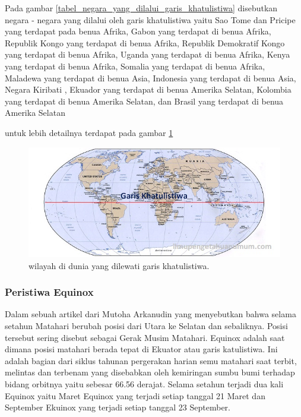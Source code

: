 	Pada gambar \ref{tabel_negara_yang_dilalui_garis_khatulistiwa} disebutkan negara - negara yang dilalui oleh garis khatulistiwa yaitu Sao Tome dan Pricipe 
yang terdapat pada benua Afrika, Gabon yang terdapat di benua Afrika, Republik Kongo yang terdapat di benua Afrika, Republik Demokratif Kongo yang terdapat 
di benua Afrika, Uganda yang terdapat di benua Afrika, Kenya yang terdapat di benua Afrika, Somalia yang terdapat di benua Afrika, Maladewa yang terdapat 
di benua Asia, Indonesia yang terdapat di benua Asia, Negara Kiribati , Ekuador yang terdapat di benua Amerika Selatan, Kolombia 
yang terdapat di benua Amerika Selatan, dan Brasil yang terdapat di benua Amerika Selatan
	
	untuk lebih detailnya terdapat pada gambar \ref{Peta_Dunia_Negara_Khatulistiwa}
	
\begin{figure}[ht]
\centerline{\includegraphics[width=1\textwidth]{figures/Peta_Dunia_Negara_Khatulistiwa.JPG}}
\caption{wilayah di dunia yang dilewati garis khatulistiwa.}
\label{Peta_Dunia_Negara_Khatulistiwa}
\end{figure}

\subsubsection {Peristiwa Equinox}

	Dalam sebuah artikel dari Mutoha Arkanudin yang menyebutkan bahwa selama setahun Matahari berubah posisi dari Utara ke Selatan dan sebaliknya. 
Posisi tersebut sering disebut sebagai Gerak Musim Matahari. Equinox adalah saat dimana posisi matahari berada tepat di Ekuator atau garis katulistiwa. 
Ini adalah bagian dari siklus tahunan pergerakan harian semu matahari saat terbit, melintas dan terbenam yang disebabkan oleh kemiringan sumbu bumi
terhadap bidang orbitnya yaitu sebesar 66.56 derajat. Selama setahun terjadi dua kali Equinox yaitu Maret Equinox yang terjadi setiap tanggal 21 Maret dan September
Ekuinox yang terjadi setiap tanggal 23 September. 

